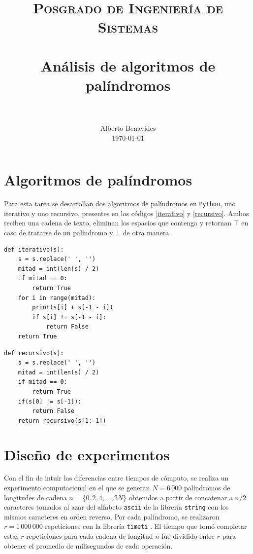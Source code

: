 \documentclass[paper=leter, fontsize=11pt]{scrartcl}
\title{
		\usefont{OT1}{bch}{b}{n}
		\normalfont \normalsize \textsc{Posgrado de Ingeniería de Sistemas} \\ [25pt]
		\horrule{0.5pt} \\[0.4cm]
		\huge Análisis de algoritmos de palíndromos \\
		\horrule{2pt} \\[0.5cm]
}
\author{
		\normalfont 								\normalsize
        Alberto Benavides\\[-3pt]		\normalsize
        \today
}
\date{}
\numberwithin{equation}{section}		%
\numberwithin{figure}{section}			%
\numberwithin{table}{section}				%
\begin{document}
\maketitle

\section{Algoritmos de palíndromos} \nocite{aa}

Para esta tarea se desarrollan dos algoritmos de palíndromos en \texttt{Python}, uno iterativo y uno recursivo, presentes en los códigos \ref{iterativo} y \ref{recursivo}. Ambos reciben una cadena de texto, eliminan los espacios que contenga y retornan $\top$ en caso de tratarse de un palíndromo y $\bot$ de otra manera.

\begin{lstlisting}[caption={Algoritmo iterativo para encontrar palíndromos.}, captionpos=t, label={iterativo}]
def iterativo(s):
    s = s.replace(' ', '')
    mitad = int(len(s) / 2)
    if mitad == 0:
        return True
    for i in range(mitad):
        print(s[i] + s[-1 - i])
        if s[i] != s[-1 - i]:
            return False
    return True
\end{lstlisting} 

\begin{lstlisting}[caption={Algoritmo recursivo para encontrar palíndromos.}, captionpos=t, label={recursivo}]
def recursivo(s):
    s = s.replace(' ', '')
    mitad = int(len(s) / 2)
    if mitad == 0:
        return True
    if(s[0] != s[-1]):
        return False
    return recursivo(s[1:-1])
\end{lstlisting}

\section{Diseño de experimentos}

Con el fin de intuir las diferencias entre tiempos de cómputo, se realiza un experimento computacional en el que se generan $N = 6\,000$ palíndromos de longitudes de cadena $n = \{ 0, 2, 4, \ldots, 2N \}$ obtenidos a partir de concatenar a $n / 2$ caracteres tomados al azar del alfabeto \texttt{ascii} de la librería \texttt{string} \cite{string} con los mismos caracteres en orden reverso. Por cada palíndromo, se realizaron $r = 1\,000\,000$ repeticiones con la librería \texttt{timeti} \cite{timeit}. El tiempo que tomó completar estas $r$ repeticiones para cada cadena de longitud $n$ fue dividido entre $r$ para obtener el promedio de milisegundos de cada operación.
\end{document}
